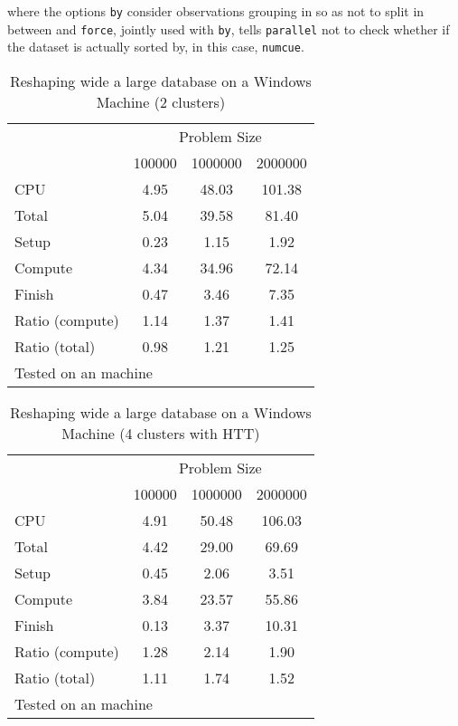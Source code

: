\documentclass[letterpaper, 10pt]{article}
\begin{document}
\noindent where the options {\tt by} consider observations grouping in so as not to split in between and {\tt force}, jointly used with {\tt by}, tells {\tt parallel} not to check whether if the dataset is actually sorted by, in this case, {\tt numcue}.

\begin{table}[!h]
\centering
\caption{Reshaping wide a large database on a Windows Machine (2 clusters)}
\begin{tabular}{l*{3}{c}}\hline
& \multicolumn{3}{c}{Problem Size} \\
& 100000 &         1000000 &         2000000 \\ \hline
CPU &     4.95 &     48.03 &    101.38 \\
Total &     5.04 &     39.58 &     81.40 \\
\hspace{2mm} Setup &     0.23 &      1.15 &      1.92 \\
\hspace{2mm} Compute &     4.34 &     34.96 &     72.14 \\
\hspace{2mm} Finish &     0.47 &      3.46 &      7.35 \\
\hline Ratio (compute) &     1.14 &      1.37 &      1.41 \\
Ratio (total) &     0.98 &      1.21 &      1.25 \\
\hline
\multicolumn{4}{l}{\footnotesize Tested on an \win1 machine}
\end{tabular}
\end{table}

\begin{table}[!h]
\centering
\caption{Reshaping wide a large database on a Windows Machine (4 clusters with HTT)}
\begin{tabular}{l*{3}{c}}\hline
& \multicolumn{3}{c}{Problem Size} \\
& 100000 &         1000000 &         2000000 \\ \hline
CPU &     4.91 &     50.48 &    106.03 \\
Total &     4.42 &     29.00 &     69.69 \\
\hspace{2mm} Setup &     0.45 &      2.06 &      3.51 \\
\hspace{2mm} Compute &     3.84 &     23.57 &     55.86 \\
\hspace{2mm} Finish &     0.13 &      3.37 &     10.31 \\
\hline Ratio (compute) &     1.28 &      2.14 &      1.90 \\
Ratio (total) &     1.11 &      1.74 &      1.52 \\
\hline
\multicolumn{4}{l}{\footnotesize Tested on an \win1 machine}
\end{tabular}
\end{table}
\end{document}
